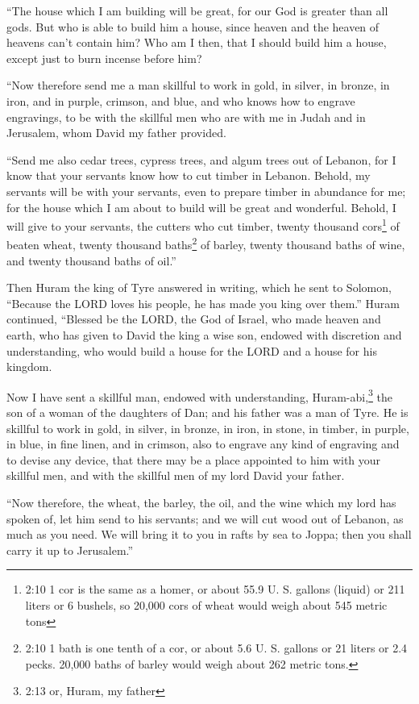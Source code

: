 \myverse{}“The house which I am building will be great, for our God is greater
than all gods.
\myverse{}But who is able to build him a house, since heaven and the heaven of heavens
can’t contain him? Who am I then, that I should build him a house, except just to burn incense before
him?

\myverse{}“Now therefore send me a man skillful to work in gold, in silver,
in bronze, in iron, and in purple, crimson, and blue, and who knows how to engrave engravings, to be with
the skillful men who are with me in Judah and in Jerusalem, whom David my father provided.

\myverse{}“Send me also cedar trees, cypress trees, and algum trees out of
Lebanon, for I know that your servants know how to cut timber in Lebanon. Behold, my servants will be
with your servants,
\myverse{}even to prepare timber in abundance for me; for the house which I am about to
build will be great and wonderful.
\myverse{}Behold, I will give to your servants, the cutters who cut timber, twenty thousand
cors\footnote{2:10 1 cor is the same as a homer, or about 55.9 U. S. gallons (liquid) or 211 liters or 6 bushels,
	so 20,000 cors of wheat would weigh about 545 metric tons} of beaten wheat, twenty thousand baths\footnote{2:10 1 bath is one tenth of a cor, or about 5.6 U. S. gallons or 21 liters or 2.4 pecks. 20,000 baths
	of barley would weigh about 262 metric tons.} of barley, twenty thousand baths of wine, and twenty
thousand baths of oil.”

\myverse{}Then Huram the king of Tyre answered in writing, which he sent
to Solomon, “Because the LORD loves his people, he has made you king over them.”
\myverse{}Huram continued, “Blessed be the LORD, the God of Israel, who made heaven
and earth, who has given to David the king a wise son, endowed with discretion and understanding, who
would build a house for the LORD and a house for his kingdom.

\myverse{}Now I have sent a skillful man, endowed with understanding, Huram-abi,\footnote{2:13 or, Huram, my father}
\myverse{}the son of a woman of the daughters of Dan; and his father was a man of Tyre.
He is skillful to work in gold, in silver, in bronze, in iron, in stone, in timber, in purple, in blue,
in fine linen, and in crimson, also to engrave any kind of engraving and to devise any device, that there
may be a place appointed to him with your skillful men, and with the skillful men of my lord David your
father.

\myverse{}“Now therefore, the wheat, the barley, the oil, and the wine
which my lord has spoken of, let him send to his servants;
\myverse{}and we will cut wood out of Lebanon, as much as you need. We will bring it
to you in rafts by sea to Joppa; then you shall carry it up to Jerusalem.”

